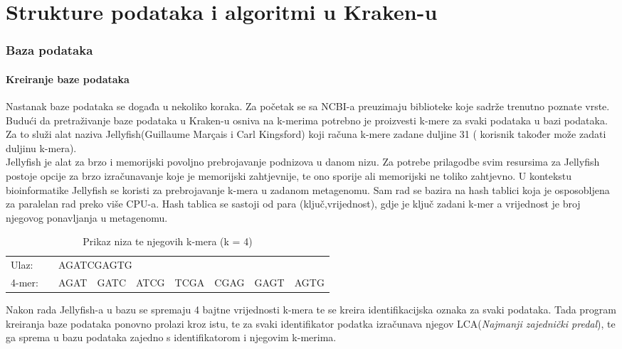 \documentclass[times, utf8, zavrsni]{fer}
\begin{document}
{\chapter{Strukture podataka i algoritmi u Kraken-u}
\subsection{Baza podataka}
\subsubsection{Kreiranje baze podataka}

Nastanak baze podataka se događa u nekoliko koraka. Za početak se sa NCBI-a preuzimaju biblioteke koje sadrže trenutno poznate vrste. Budući da pretraživanje baze podataka u Kraken-u osniva na k-merima potrebno je proizvesti k-mere za svaki podataka u bazi podataka. Za to služi alat naziva Jellyfish(Guillaume Marçais i Carl Kingsford) koji računa k-mere zadane duljine 31 ( korisnik također može zadati duljinu k-mera).\\Jellyfish je alat za brzo i memorijski povoljno prebrojavanje podnizova u danom nizu. Za potrebe prilagodbe svim resursima za Jellyfish postoje opcije za brzo izračunavanje koje je memorijski zahtjevnije, te ono sporije ali memorijski ne toliko zahtjevno. U kontekstu bioinformatike Jellyfish se koristi za prebrojavanje k-mera u zadanom metagenomu. Sam rad se bazira na hash tablici koja je osposobljena za paralelan rad preko više CPU-a. Hash tablica se sastoji od para (ključ,vrijednost), gdje je ključ zadani k-mer a vrijednost je broj njegovog ponavljanja u metagenomu.
	 	
\begin{table}[hbp]
	\centering
	\caption{Prikaz niza te njegovih k-mera (k = 4)}
	\label{Prikaz k-mera}
	\begin{tabular}{llllllllll}
		Ulaz:  &           & \multicolumn{8}{l}{AGATCGAGTG}                            \\
		4-mer: & \multicolumn{2}{l}{} & AGAT & GATC & ATCG & TCGA & CGAG & GAGT & AGTG
	\end{tabular}
\end{table}
Nakon rada Jellyfish-a u bazu se spremaju 4 bajtne vrijednosti k-mera te se kreira identifikacijska oznaka za svaki podataka. Tada program kreiranja baze podataka ponovno prolazi kroz istu, te za svaki identifikator podatka izračunava njegov LCA(\textit{Najmanji zajednički predal}), te ga sprema u bazu podataka zajedno s identifikatorom i njegovim k-merima.
}
\end{document}
